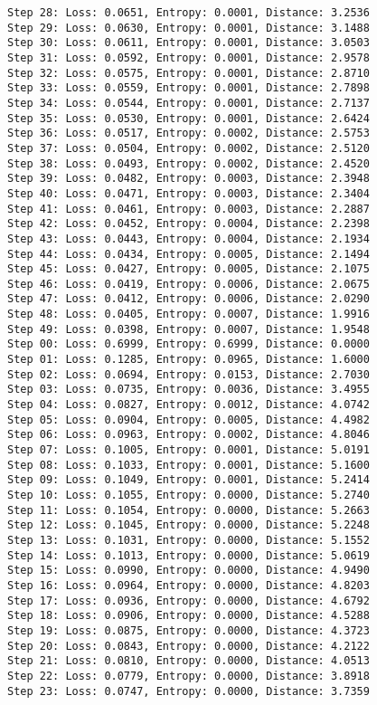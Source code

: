 \documentclass[11pt]{article}
\begin{document}
\begin{Verbatim}[commandchars=\\\{\}]
Step 28: Loss: 0.0651, Entropy: 0.0001, Distance: 3.2536
Step 29: Loss: 0.0630, Entropy: 0.0001, Distance: 3.1488
Step 30: Loss: 0.0611, Entropy: 0.0001, Distance: 3.0503
Step 31: Loss: 0.0592, Entropy: 0.0001, Distance: 2.9578
Step 32: Loss: 0.0575, Entropy: 0.0001, Distance: 2.8710
Step 33: Loss: 0.0559, Entropy: 0.0001, Distance: 2.7898
Step 34: Loss: 0.0544, Entropy: 0.0001, Distance: 2.7137
Step 35: Loss: 0.0530, Entropy: 0.0001, Distance: 2.6424
Step 36: Loss: 0.0517, Entropy: 0.0002, Distance: 2.5753
Step 37: Loss: 0.0504, Entropy: 0.0002, Distance: 2.5120
Step 38: Loss: 0.0493, Entropy: 0.0002, Distance: 2.4520
Step 39: Loss: 0.0482, Entropy: 0.0003, Distance: 2.3948
Step 40: Loss: 0.0471, Entropy: 0.0003, Distance: 2.3404
Step 41: Loss: 0.0461, Entropy: 0.0003, Distance: 2.2887
Step 42: Loss: 0.0452, Entropy: 0.0004, Distance: 2.2398
Step 43: Loss: 0.0443, Entropy: 0.0004, Distance: 2.1934
Step 44: Loss: 0.0434, Entropy: 0.0005, Distance: 2.1494
Step 45: Loss: 0.0427, Entropy: 0.0005, Distance: 2.1075
Step 46: Loss: 0.0419, Entropy: 0.0006, Distance: 2.0675
Step 47: Loss: 0.0412, Entropy: 0.0006, Distance: 2.0290
Step 48: Loss: 0.0405, Entropy: 0.0007, Distance: 1.9916
Step 49: Loss: 0.0398, Entropy: 0.0007, Distance: 1.9548
Step 00: Loss: 0.6999, Entropy: 0.6999, Distance: 0.0000
Step 01: Loss: 0.1285, Entropy: 0.0965, Distance: 1.6000
Step 02: Loss: 0.0694, Entropy: 0.0153, Distance: 2.7030
Step 03: Loss: 0.0735, Entropy: 0.0036, Distance: 3.4955
Step 04: Loss: 0.0827, Entropy: 0.0012, Distance: 4.0742
Step 05: Loss: 0.0904, Entropy: 0.0005, Distance: 4.4982
Step 06: Loss: 0.0963, Entropy: 0.0002, Distance: 4.8046
Step 07: Loss: 0.1005, Entropy: 0.0001, Distance: 5.0191
Step 08: Loss: 0.1033, Entropy: 0.0001, Distance: 5.1600
Step 09: Loss: 0.1049, Entropy: 0.0001, Distance: 5.2414
Step 10: Loss: 0.1055, Entropy: 0.0000, Distance: 5.2740
Step 11: Loss: 0.1054, Entropy: 0.0000, Distance: 5.2663
Step 12: Loss: 0.1045, Entropy: 0.0000, Distance: 5.2248
Step 13: Loss: 0.1031, Entropy: 0.0000, Distance: 5.1552
Step 14: Loss: 0.1013, Entropy: 0.0000, Distance: 5.0619
Step 15: Loss: 0.0990, Entropy: 0.0000, Distance: 4.9490
Step 16: Loss: 0.0964, Entropy: 0.0000, Distance: 4.8203
Step 17: Loss: 0.0936, Entropy: 0.0000, Distance: 4.6792
Step 18: Loss: 0.0906, Entropy: 0.0000, Distance: 4.5288
Step 19: Loss: 0.0875, Entropy: 0.0000, Distance: 4.3723
Step 20: Loss: 0.0843, Entropy: 0.0000, Distance: 4.2122
Step 21: Loss: 0.0810, Entropy: 0.0000, Distance: 4.0513
Step 22: Loss: 0.0779, Entropy: 0.0000, Distance: 3.8918
Step 23: Loss: 0.0747, Entropy: 0.0000, Distance: 3.7359

\end{Verbatim}
\end{document}

